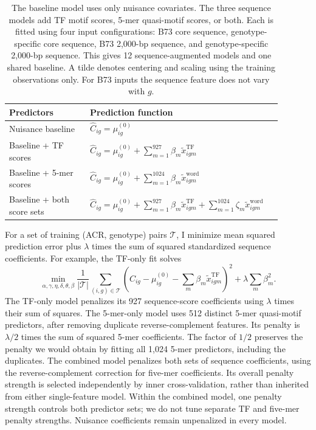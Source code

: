 \documentclass[10pt]{article}
\begin{document}
\begin{table}[htbp]
\centering\small
\begin{tabular}{p{0.29\linewidth}p{0.60\linewidth}}
\toprule
Predictors & Prediction function\\
\midrule
Nuisance baseline & $\widehat C_{ig}=\mu^{(0)}_{ig}$\\[3pt]
Baseline + TF scores & $\widehat C_{ig}=\mu^{(0)}_{ig}+\sum_{m=1}^{927}\beta_m\widetilde x^{\mathrm{TF}}_{igm}$\\[3pt]
Baseline + 5-mer scores & $\widehat C_{ig}=\mu^{(0)}_{ig}+\sum_{m=1}^{1024}\beta_m\widetilde x^{\mathrm{word}}_{igm}$\\[3pt]
Baseline + both score sets & $\widehat C_{ig}=\mu^{(0)}_{ig}+\sum_{m=1}^{927}\beta_m\widetilde x^{\mathrm{TF}}_{igm}+\sum_{m=1}^{1024}\zeta_m\widetilde x^{\mathrm{word}}_{igm}$\\
\bottomrule
\end{tabular}
\caption{The baseline model uses only nuisance covariates. The three
sequence models add TF motif scores, 5-mer quasi-motif scores, or
both. Each is fitted using four input configurations: B73 core
sequence, genotype-specific core sequence, B73 2,000-bp sequence,
and genotype-specific 2,000-bp sequence. This gives 12
sequence-augmented models and one shared baseline. A tilde denotes centering and scaling using the training observations only. For B73 inputs the sequence feature does not vary with $g$.} 
\label{tab:models}
\end{table}

For a set of training (ACR, genotype) pairs $\mathcal T$, I minimize mean squared prediction error plus $\lambda$ times the sum of squared standardized sequence coefficients. For example, the TF-only fit solves
\[
\min_{\alpha,\gamma,\eta,\delta,\theta,\beta}
\frac{1}{|\mathcal T|}\sum_{(i,g)\in\mathcal T}
\left(C_{ig}-\mu^{(0)}_{ig}-\sum_m\beta_m\widetilde x^{\mathrm{TF}}_{igm}\right)^2
+\lambda\sum_m\beta_m^2.
\]
The TF-only model penalizes its 927 sequence-score coefficients
using $\lambda$ times their sum of squares. The 5-mer-only model
uses 512 distinct 5-mer quasi-motif predictors, after removing
duplicate reverse-complement features. Its penalty is
$\lambda/2$ times the sum of squared 5-mer coefficients. The
factor of $1/2$ preserves the penalty we would obtain by fitting
all 1,024 5-mer predictors, including the duplicates. The combined model penalizes both sets of sequence coefficients,
using the reverse-complement correction for five-mer coefficients.
Its overall penalty strength is selected independently by inner
cross-validation, rather than inherited from either single-feature
model. Within the combined model, one penalty strength controls
both predictor sets; we do not tune separate TF and five-mer
penalty strengths.
Nuisance coefficients remain unpenalized in every model.
\end{document}
